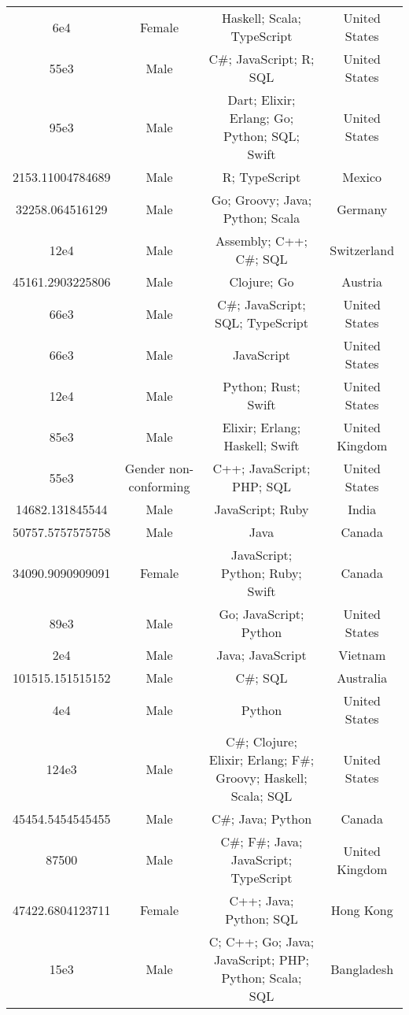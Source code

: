\begin{center}
\begin{tabular}{ |c|c|c|c| }
6e4  &  Female  &  Haskell; Scala; TypeScript  &  United States  \\ 
55e3  &  Male  &  C\#; JavaScript; R; SQL  &  United States  \\ 
95e3  &  Male  &  Dart; Elixir; Erlang; Go; Python; SQL; Swift  &  United States  \\ 
2153.11004784689  &  Male  &  R; TypeScript  &  Mexico  \\ 
32258.064516129  &  Male  &  Go; Groovy; Java; Python; Scala  &  Germany  \\ 
12e4  &  Male  &  Assembly; C++; C\#; SQL  &  Switzerland  \\ 
45161.2903225806  &  Male  &  Clojure; Go  &  Austria  \\ 
66e3  &  Male  &  C\#; JavaScript; SQL; TypeScript  &  United States  \\ 
66e3  &  Male  &  JavaScript  &  United States  \\ 
12e4  &  Male  &  Python; Rust; Swift  &  United States  \\ 
85e3  &  Male  &  Elixir; Erlang; Haskell; Swift  &  United Kingdom  \\ 
55e3  &  Gender non-conforming  &  C++; JavaScript; PHP; SQL  &  United States  \\ 
14682.131845544  &  Male  &  JavaScript; Ruby  &  India  \\ 
50757.5757575758  &  Male  &  Java  &  Canada  \\ 
34090.9090909091  &  Female  &  JavaScript; Python; Ruby; Swift  &  Canada  \\ 
89e3  &  Male  &  Go; JavaScript; Python  &  United States  \\ 
2e4  &  Male  &  Java; JavaScript  &  Vietnam  \\ 
101515.151515152  &  Male  &  C\#; SQL  &  Australia  \\ 
4e4  &  Male  &  Python  &  United States  \\ 
124e3  &  Male  &  C\#; Clojure; Elixir; Erlang; F\#; Groovy; Haskell; Scala; SQL  &  United States  \\ 
45454.5454545455  &  Male  &  C\#; Java; Python  &  Canada  \\ 
87500  &  Male  &  C\#; F\#; Java; JavaScript; TypeScript  &  United Kingdom  \\ 
47422.6804123711  &  Female  &  C++; Java; Python; SQL  &  Hong Kong  \\ 
15e3  &  Male  &  C; C++; Go; Java; JavaScript; PHP; Python; Scala; SQL  &  Bangladesh  \\ 

\end{tabular}
\end{center}
